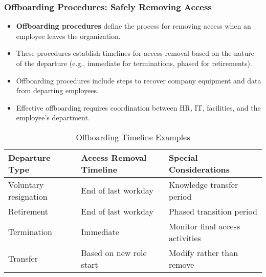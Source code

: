 \documentclass{beamer}
\begin{document}
\begin{frame}
\frametitle{Offboarding Procedures: Safely Removing Access}
\begin{itemize}
\item \textbf{Offboarding procedures} define the process for removing access when an employee leaves the organization.
\item These procedures establish timelines for access removal based on the nature of the departure (e.g., immediate for terminations, phased for retirements).
\item Offboarding procedures include steps to recover company equipment and data from departing employees.
\item Effective offboarding requires coordination between HR, IT, facilities, and the employee's department.
\end{itemize}

\begin{table}
\scriptsize
\begin{tabular}{|p{3cm}|p{3cm}|p{3cm}|}
\hline
\textbf{Departure Type} & \textbf{Access Removal Timeline} & \textbf{Special Considerations} \\
\hline
Voluntary resignation & End of last workday & Knowledge transfer period \\
\hline
Retirement & End of last workday & Phased transition period \\
\hline
Termination & Immediate & Monitor final access activities \\
\hline
Transfer & Based on new role start & Modify rather than remove \\
\hline
\end{tabular}
\caption{Offboarding Timeline Examples}
\end{table}
\end{frame}
\end{document}
